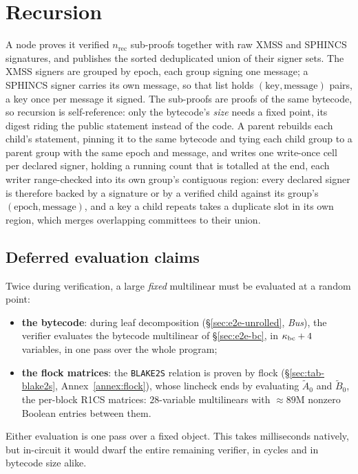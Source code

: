 \section{Recursion}\label{sec:recursion}

A node proves it verified $n_{\mathrm{rec}}$ sub-proofs together with raw XMSS and SPHINCS signatures, and publishes the sorted deduplicated union of their signer sets. The XMSS signers are grouped by epoch, each group signing one message; a SPHINCS signer carries its own message, so that list holds $(\text{key},\text{message})$ pairs, a key once per message it signed. The sub-proofs are proofs of the same bytecode, so recursion is self-reference: only the bytecode's \emph{size} needs a fixed point, its digest riding the public statement instead of the code. A parent rebuilds each child's statement, pinning it to the same bytecode and tying each child group to a parent group with the same epoch and message, and writes one write-once cell per declared signer, holding a running count that is totalled at the end, each writer range-checked into its own group's contiguous region: every declared signer is therefore backed by a signature or by a verified child against its group's $(\text{epoch},\text{message})$, and a key a child repeats takes a duplicate slot in its own region, which merges overlapping committees to their union.


\subsection{Deferred evaluation claims}\label{sec:deferred-claims}

Twice during verification, a large \emph{fixed} multilinear must be evaluated at a random point:
\begin{itemize}
\item \textbf{the bytecode}: during leaf decomposition (\S\ref{sec:e2e-unrolled}, \emph{Bus}), the verifier evaluates the bytecode multilinear of \S\ref{sec:e2e-bc}, in $\kappa_{\mathrm{bc}}+4$ variables, in one pass over the whole program;
\item \textbf{the flock matrices}: the \texttt{BLAKE2S} relation is proven by flock (\S\ref{sec:tab-blake2s}, Annex~\ref{annex:flock}), whose lincheck ends by evaluating $\widetilde A_0$ and $\widetilde B_0$, the per-block R1CS matrices: $28$-variable multilinears with $\approx 89\mathrm{M}$ nonzero Boolean entries between them.
\end{itemize}
Either evaluation is one pass over a fixed object. This takes milliseconds natively, but in-circuit it would dwarf the entire remaining verifier, in cycles and in bytecode size alike.

